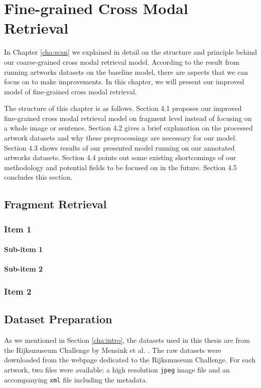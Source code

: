 \chapter{Fine-grained Cross Modal Retrieval}
\label{cha:Method}

In Chapter \ref{cha:scan} we explained in detail on the structure and principle behind our coarse-grained cross modal retrieval model. According to the result from running artworks datasets on the baseline model, there are aspects that we can focus on to make improvements. In this chapter, we will present our improved model of fine-grained cross modal retrieval.

The structure of this chapter is as follows. Section 4.1 proposes our improved fine-grained cross modal retrieval model on fragment level instead of focusing on a whole image or sentence. Section 4.2 gives a brief explanation on the processed artwork datasets and why these preprocessings are necessary for our model. Section 4.3 shows results of our presented model running on our annotated artworks datasets. Section 4.4 points out some existing shortcomings of our methodology and potential fields to be focused on in the future. Section 4.5 concludes this section.

\section{Fragment Retrieval}
\subsection{Item 1}

\subsubsection{Sub-item 1}

\subsubsection{Sub-item 2}

\subsection{Item 2}

\section{Dataset Preparation}
As we mentioned in Section \ref{cha:intro}, the datasets used in this thesis are from the Rijksmuseum Challenge by Mensink et al. \cite{MensinkICMIR2014}. The raw datasets were downloaded from the webpage dedicated to the Rijksmuseum Challenge. For each artwork, two files were available: a high resolution \verb|jpeg| image file and an accompanying \verb|xml| file including the metadata.
